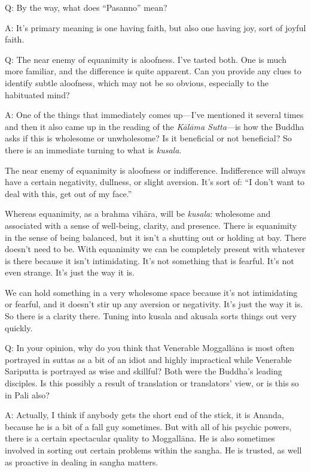 Q: By the way, what does “Pasanno” mean?

A: It’s primary meaning is one having faith, but also one having joy,
sort of joyful faith.

Q: The near enemy of equanimity is aloofness. I’ve tasted both. One is
much more familiar, and the difference is quite apparent. Can you
provide any clues to identify subtle aloofness, which may not be so
obvious, especially to the habituated mind?

A: One of the things that immediately comes up—I’ve mentioned it several
times and then it also came up in the reading of the \emph{Kālāma
Sutta}—is how the Buddha asks if this is wholesome or unwholesome? Is it
beneficial or not beneficial? So there is an immediate turning to what
is \emph{kusala}.

The near enemy of equanimity is aloofness or indifference. Indifference
will always have a certain negativity, dullness, or slight aversion.
It’s sort of: “I don’t want to deal with this, get out of my face.”

Whereas equanimity, as a brahma vihāra, will be \emph{kusala}: wholesome
and associated with a sense of well-being, clarity, and presence. There
is equanimity in the sense of being balanced, but it isn’t a shutting
out or holding at bay. There doesn’t need to be. With equanimity we can
be completely present with whatever is there because it isn’t
intimidating. It’s not something that is fearful. It’s not even strange.
It’s just the way it is.

We can hold something in a very wholesome space because it’s not
intimidating or fearful, and it doesn’t stir up any aversion or
negativity. It’s just the way it is. So there is a clarity there. Tuning
into kusala and akusala sorts things out very quickly.

Q: In your opinion, why do you think that Venerable Moggallāna is most
often portrayed in suttas as a bit of an idiot and highly impractical
while Venerable Sariputta is portrayed as wise and skillful? Both were
the Buddha’s leading disciples. Is this possibly a result of translation
or translators’ view, or is this so in Pali also?

A: Actually, I think if anybody gets the short end of the stick, it is
Ananda, because he is a bit of a fall guy sometimes. But with all of his
psychic powers, there is a certain spectacular quality to Moggallāna. He
is also sometimes involved in sorting out certain problems within the
sangha. He is trusted, as well as proactive in dealing in sangha
matters.

